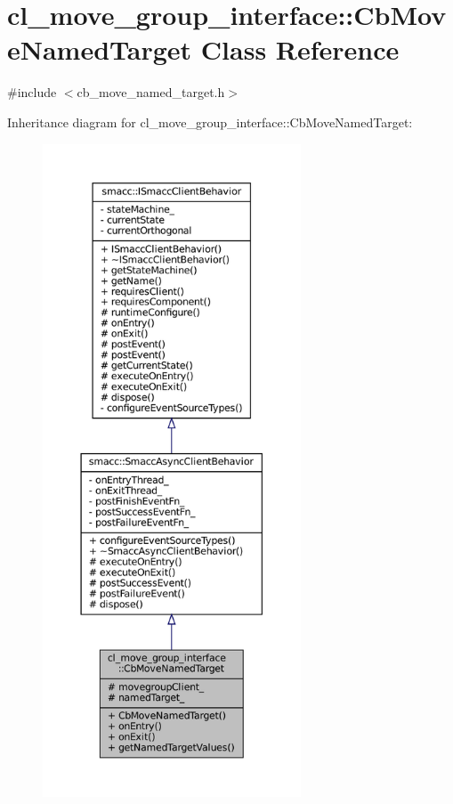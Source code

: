 \hypertarget{classcl__move__group__interface_1_1CbMoveNamedTarget}{}\section{cl\+\_\+move\+\_\+group\+\_\+interface\+:\+:Cb\+Move\+Named\+Target Class Reference}
\label{classcl__move__group__interface_1_1CbMoveNamedTarget}


{\ttfamily \#include $<$cb\+\_\+move\+\_\+named\+\_\+target.\+h$>$}



Inheritance diagram for cl\+\_\+move\+\_\+group\+\_\+interface\+:\+:Cb\+Move\+Named\+Target\+:
\nopagebreak
\begin{figure}[H]
\begin{center}
\leavevmode
\includegraphics[height=550pt]{classcl__move__group__interface_1_1CbMoveNamedTarget__inherit__graph}
\end{center}
\end{figure}


